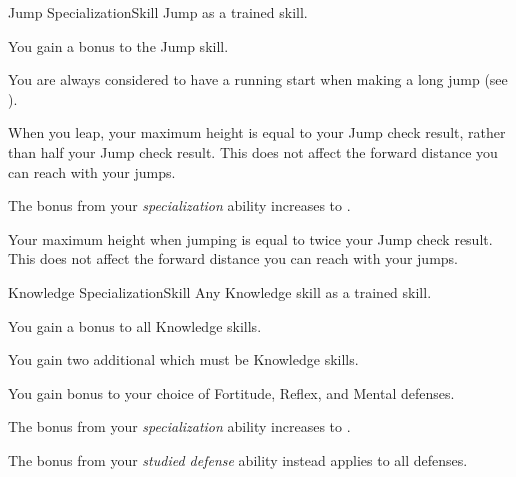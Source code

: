     \begin{feat}{Jump Specialization}{Skill}
        \featpre Jump as a trained skill.

         You gain a  bonus to the Jump skill.

         You are always considered to have a running start when making a long jump (see ).

         When you leap, your maximum height is equal to your Jump check result, rather than half your Jump check result.
        This does not affect the forward distance you can reach with your jumps.

         The bonus from your \textit{specialization} ability increases to .

         Your maximum height when jumping is equal to twice your Jump check result.
        This does not affect the forward distance you can reach with your jumps.
    \end{feat}

    \begin{feat}{Knowledge Specialization}{Skill}
        \featpre Any Knowledge skill as a trained skill.

         You gain a  bonus to all Knowledge skills.

         You gain two additional  which must be Knowledge skills.

         You gain  bonus to your choice of Fortitude, Reflex, and Mental defenses. 

         The bonus from your \textit{specialization} ability increases to .

         The bonus from your \textit{studied defense} ability instead applies to all defenses.
    \end{feat}

